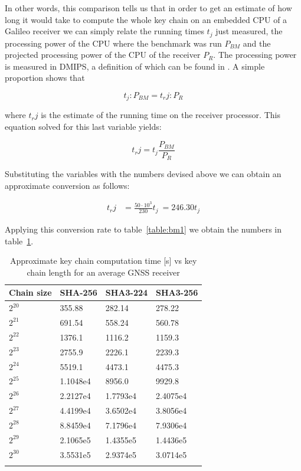 In other words, this comparison tells us that in order to get an estimate of how
long it would take to compute the whole key chain on an embedded CPU of a
Galileo receiver we can simply relate the running times $t_j$ just measured, the
processing power of the CPU where the benchmark was run $P_{BM}$ and the
projected processing power of the CPU of the receiver $P_R$. The processing
power is measured in DMIPS, a definition of which can be found in \cite{dmips}.
A simple proportion shows that

\begin{equation}
  t_j : P_{BM} = t_rj : P_R
\end{equation}

where $t_rj$ is the estimate of the running time on the receiver processor. This
equation solved for this last variable yields:

\[
  t_rj = t_j \frac{P_{BM}}{P_R}
\]

Substituting the variables with the numbers devised above we can obtain an
approximate conversion as follows:

\begin{equation}
  \label{eq:mips_conv}
  \begin{aligned}
  t_rj &= \frac{50 \cdot 10^3}{230} t_j\
        = 246.30 t_j
  \end{aligned}
\end{equation}

Applying this conversion rate to table~\ref{table:bm1} we obtain the numbers in
table~\ref{table:bm1_recv}.

\begin{longtable}[]{@{}llll@{}}
\toprule
Chain size & SHA-256 & SHA3-224 & SHA3-256\tabularnewline
\midrule
\endhead
$2^{20}$ & 355.88 & 282.14 & 278.22\tabularnewline
$2^{21}$ & 691.54 & 558.24 & 560.78\tabularnewline
$2^{22}$ & 1376.1 & 1116.2 & 1159.3\tabularnewline
$2^{23}$ & 2755.9 & 2226.1 & 2239.3\tabularnewline
$2^{24}$ & 5519.1 & 4473.1 & 4475.3\tabularnewline
$2^{25}$ & 1.1048e4 & 8956.0 & 9929.8\tabularnewline
$2^{26}$ & 2.2127e4 & 1.7793e4 & 2.4075e4\tabularnewline
$2^{27}$ & 4.4199e4 & 3.6502e4 & 3.8056e4\tabularnewline
$2^{28}$ & 8.8459e4 & 7.1796e4 & 7.9306e4\tabularnewline
$2^{29}$ & 2.1065e5 & 1.4355e5 & 1.4436e5\tabularnewline
$2^{30}$ & 3.5531e5 & 2.9374e5 & 3.0714e5\tabularnewline
\bottomrule
\caption{Approximate key chain computation time [s] vs key chain length for an
average GNSS receiver}
\label{table:bm1_recv}
\end{longtable}

